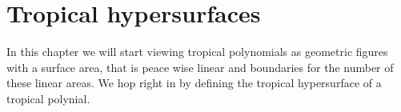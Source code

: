 \documentclass{article}
\theoremstyle{definition}
\newtheorem{lemma}[theorem]{Lemma}
\newtheorem{definition}[theorem]{Definition}
\begin{document}
%

\section{Tropical hypersurfaces}
\label{sec:tropical_hypersurfaces}

In this chapter we will start viewing tropical polynomials as geometric figures with a surface area, that is peace wise linear and boundaries for the number of these linear areas. We hop right in by defining the tropical hypersurface of a tropical polynial. 
 
\end{document}
